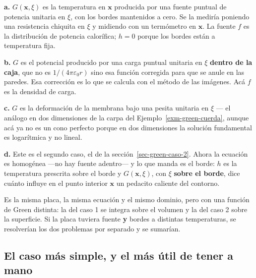 \documentclass[
  spanish,
  a4paper,
]{scrbook}
\theoremstyle{definition}
\theoremstyle{plain}
\theoremstyle{definition}
\theoremstyle{plain}
\theoremstyle{definition}
\theoremstyle{remark}
\begin{document}
\begin{tcolorbox}[enhanced jigsaw, arc=.35mm, bottomrule=.15mm, bottomtitle=1mm, breakable, colback=white, colbacktitle=quarto-callout-tip-color!10!white, colframe=quarto-callout-tip-color-frame, coltitle=black, left=2mm, leftrule=.75mm, opacityback=0, opacitybacktitle=0.6, rightrule=.15mm, title=\textcolor{quarto-callout-tip-color}{\faLightbulb}\hspace{0.5em}{Solución}, titlerule=0mm, toprule=.15mm, toptitle=1mm]

\textbf{a.} \(G(\mathbf{x},\xi)\) es la temperatura en \(\mathbf{x}\)
producida por una fuente puntual de potencia unitaria en \(\xi\), con
los bordes mantenidos a cero. Se la mediría poniendo una resistencia
chiquita en \(\xi\) y midiendo con un termómetro en \(\mathbf{x}\). La
fuente \(f\) es la distribución de potencia calorífica; \(h=0\) porque
los bordes están a temperatura fija.

\textbf{b.} \(G\) es el potencial producido por una carga puntual
unitaria en \(\xi\) \textbf{dentro de la caja}, que no es
\(1/(4\pi\varepsilon_0 r)\) sino esa función corregida para que se anule
en las paredes. Esa corrección es lo que se calcula con el método de las
imágenes. Acá \(f\) es la densidad de carga.

\textbf{c.} \(G\) es la deformación de la membrana bajo una pesita
unitaria en \(\xi\) --- el análogo en dos dimensiones de la carpa del
Ejemplo~\ref{exm-green-cuerda}, aunque acá ya no es un cono perfecto
porque en dos dimensiones la solución fundamental es logarítmica y no
lineal.

\textbf{d.} Este es el segundo caso, el de la
sección~\ref{sec-green-caso-2}. Ahora la ecuación es homogénea ---no hay
fuente adentro--- y lo que manda es el borde: \(h\) es la temperatura
prescrita sobre el borde y \(G(\mathbf{x},\xi)\), con \(\xi\)
\textbf{sobre el borde}, dice cuánto influye en el punto interior
\(\mathbf{x}\) un pedacito caliente del contorno.

Es la misma placa, la misma ecuación y el mismo dominio, pero con una
función de Green distinta: la del caso 1 se integra sobre el volumen y
la del caso 2 sobre la superficie. Si la placa tuviera fuente \textbf{y}
bordes a distintas temperaturas, se resolverían los dos problemas por
separado y se sumarían.

\end{tcolorbox}

\subsection{El caso más simple, y el más útil de tener a
mano}\label{sec-green-cuerda}
\end{document}
